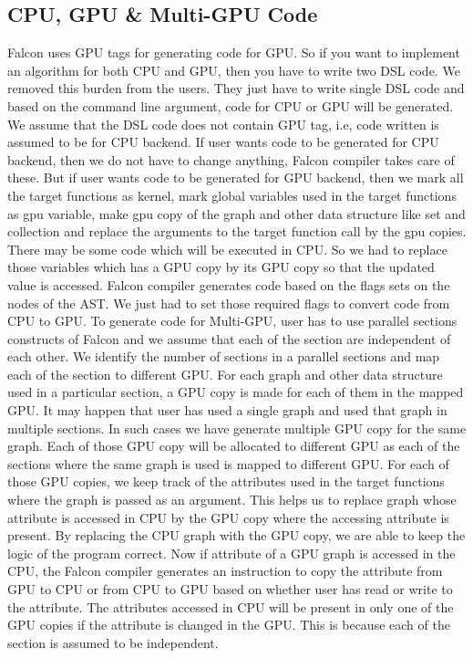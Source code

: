 \documentclass[12pt]{article}
\begin{document}
\subsection{CPU, GPU \& Multi-GPU Code}\label{sec:cpugpu}
Falcon uses GPU tags for generating code for GPU. So if you want to implement an algorithm for both CPU and GPU, then you have to write two DSL code. We removed this burden from the users. They just have to write single DSL code and based on the command line argument, code for CPU or GPU will be generated.
We assume that the DSL code does not contain GPU tag, i.e, code written is assumed to be for CPU backend. If user wants code to be generated for CPU backend, then we do not have to change anything, Falcon compiler takes care of these. But if user  wants code to be generated for GPU backend, then we mark all the target functions as kernel, mark global variables used in the target functions as gpu variable, make gpu copy of the graph and other data structure like set and collection  and replace the arguments to the target function call by the gpu copies. There may be some code which will be executed in CPU. So we had to replace those variables which has a GPU copy by its GPU copy so that the updated value is accessed. Falcon compiler generates code based on the flags sets on the nodes of the AST. We just had to set those required flags to convert code from CPU to GPU.
To generate code for Multi-GPU, user has to use parallel sections constructs of Falcon and we assume that each of the section are independent of each other. We identify the number of sections in a parallel sections and map each of the section to different GPU. For each graph and other data structure used in a particular section, a GPU copy is made for each of them in the mapped GPU. It may happen that user has used a single graph and used that graph in multiple sections. In such cases we have generate multiple GPU copy for the same graph. Each of those GPU copy will be allocated to different GPU as each of the sections where the same graph is used is mapped to different GPU. For each of those GPU copies, we keep track of the attributes used in the target functions where the graph is passed as an argument. This helps us to replace graph whose attribute is accessed in CPU by the GPU copy where the accessing attribute is present. By replacing the CPU graph with the GPU copy, we are able to keep the logic of the program correct. Now if attribute of a GPU graph is accessed in the CPU, the Falcon compiler generates an instruction to copy the attribute from GPU to CPU or from CPU to GPU based on whether user has read or write to the attribute. The attributes accessed in CPU will be present in only one of the GPU copies if the attribute is changed in the GPU. This is because each of the section is assumed to be independent.
\end{document}
